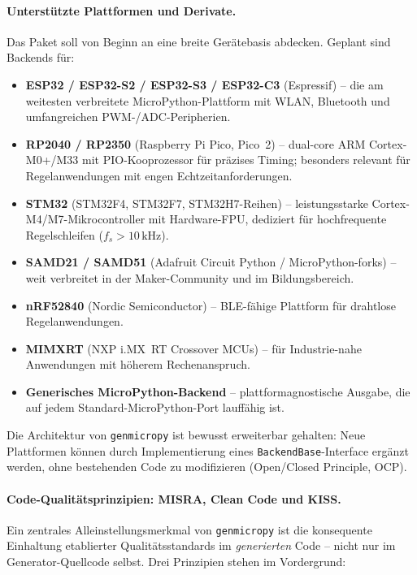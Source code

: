 \documentclass[a4paper,12pt]{article}
\theoremstyle{definition}
\begin{document}
\paragraph{Unterstützte Plattformen und Derivate.}
Das Paket soll von Beginn an eine breite Gerätebasis abdecken. Geplant sind
Backends für:
\begin{itemize}
    \item \textbf{ESP32 / ESP32-S2 / ESP32-S3 / ESP32-C3} (Espressif) -- die am
          weitesten verbreitete MicroPython-Plattform mit WLAN, Bluetooth und
          umfangreichen PWM-/ADC-Peripherien.
    \item \textbf{RP2040 / RP2350} (Raspberry Pi Pico, Pico~2) -- dual-core
          ARM Cortex-M0+/M33 mit PIO-Kooprozessor für präzises Timing;
          besonders relevant für Regelanwendungen mit engen Echtzeitanforderungen.
    \item \textbf{STM32} (STM32F4, STM32F7, STM32H7-Reihen) -- leistungsstarke
          Cortex-M4/M7-Mikrocontroller mit Hardware-FPU, dediziert für
          hochfrequente Regelschleifen ($f_s > 10\,\mathrm{kHz}$).
    \item \textbf{SAMD21 / SAMD51} (Adafruit Circuit Python / MicroPython-forks) --
          weit verbreitet in der Maker-Community und im Bildungsbereich.
    \item \textbf{nRF52840} (Nordic Semiconductor) -- BLE-fähige Plattform für
          drahtlose Regelanwendungen.
    \item \textbf{MIMXRT} (NXP i.MX~RT Crossover MCUs) -- für
          Industrie-nahe Anwendungen mit höherem Rechenanspruch.
    \item \textbf{Generisches MicroPython-Backend} -- plattformagnostische
          Ausgabe, die auf jedem Standard-MicroPython-Port lauffähig ist.
\end{itemize}
Die Architektur von \texttt{genmicropy} ist bewusst erweiterbar gehalten: Neue
Plattformen können durch Implementierung eines \texttt{BackendBase}-Interface
ergänzt werden, ohne bestehenden Code zu modifizieren (Open/Closed Principle,
OCP).

\paragraph{Code-Qualitätsprinzipien: MISRA, Clean Code und KISS.}
Ein zentrales Alleinstellungsmerkmal von \texttt{genmicropy} ist die konsequente
Einhaltung etablierter Qualitätsstandards im \emph{generierten} Code -- nicht
nur im Generator-Quellcode selbst. Drei Prinzipien stehen im Vordergrund:
\end{document}
